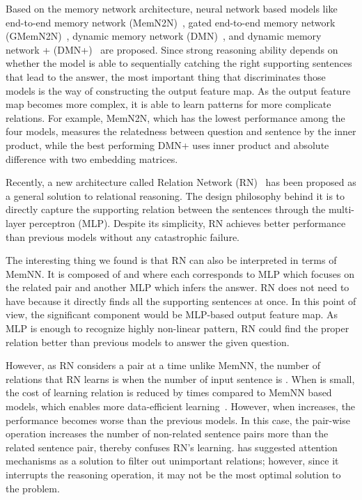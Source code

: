 \documentclass{article} \usepackage{iclr2018_conference,times}
\begin{document}
Based on the memory network architecture, neural network based models like end-to-end memory network (MemN2N)~\citep{sukhbaatar2015end}, gated end-to-end memory network (GMemN2N)~\citep{liu2017gated}, dynamic memory network (DMN)~\citep{kumar2016ask}, and dynamic memory network + (DMN+)~\citep{xiong2016dynamic} are proposed.
Since strong reasoning ability depends on whether the model is able to sequentially catching the right supporting sentences that lead to the answer, the most important thing that discriminates those models is the way of constructing the output feature map. As the output feature map becomes more complex, it is able to learn patterns for more complicate relations.
For example, MemN2N, which has the lowest performance among the four models, measures the relatedness between question and sentence by the inner product, while the best performing DMN+ uses inner product and absolute difference with two embedding matrices.



Recently, a new architecture called Relation Network (RN)~\citep{santoro2017simple} has been proposed as a general  solution to relational reasoning. 
The design philosophy behind it is to directly capture the supporting relation between the sentences through the multi-layer perceptron (MLP).
Despite its simplicity, RN achieves better performance than previous models without any catastrophic failure. 

The interesting thing we found is that RN can also be interpreted in terms of MemNN. 
It is composed of  and  where each corresponds to MLP which focuses on the related pair and another MLP which infers the answer.
RN does not need to have  because it directly finds all the supporting sentences at once.
In this point of view, the significant component would be MLP-based output feature map.
As MLP is enough to recognize highly non-linear pattern, RN could find the proper relation better than previous models to answer the given question.

However, as RN considers a pair at a time unlike MemNN, the number of relations that RN learns is  when the number of input sentence is .
When  is small, the cost of learning relation is reduced by  times compared to MemNN based models, which enables more data-efficient learning~\citep{santoro2017simple}.
However, when  increases, the performance becomes worse than the previous models.
In this case, the pair-wise operation increases the number of non-related sentence pairs more than the related sentence pair, thereby confuses RN's learning.
\citet{santoro2017simple} has suggested attention mechanisms as a solution to filter out unimportant relations; however, since it interrupts the reasoning operation, it may not be the most optimal solution to the problem.
\end{document}

